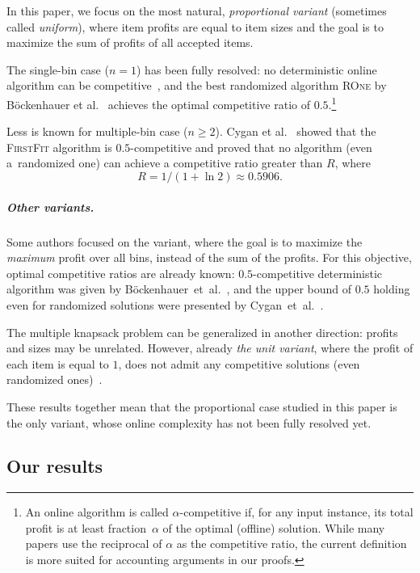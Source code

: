 \documentclass[a4paper,USenglish,cleveref]{lipics-v2019}
\newcommand{\R}{\ensuremath{R}}
\begin{document}
In this paper, we focus on the most natural, \emph{proportional variant}
(sometimes called \emph{uniform}), where item profits are equal to item sizes
and the goal is to maximize the sum of profits of all accepted items.

The single-bin case ($n = 1$) has been fully resolved: no deterministic online
algorithm can be competitive~\cite{MarVer95}, and the best randomized algorithm
\textsc{ROne} by Böckenhauer et al.~\cite{BKoKR14} achieves the optimal
competitive ratio of $0.5$.\footnote{An online algorithm is called
$\alpha$-competitive if, for any input instance, its total profit is at least
fraction~$\alpha$ of the optimal (offline) solution. While many papers use the
reciprocal of $\alpha$ as the competitive ratio, the current definition is more
suited for accounting arguments in our proofs.} 

Less is known for multiple-bin case ($n \geq 2$). Cygan et al.~\cite{CyJeSg16}
showed that the \textsc{FirstFit} algorithm is $0.5$-competitive and proved that
no algorithm (even a~randomized one) can achieve a competitive ratio greater than
$\R$, where 
\[
	\R = 1/(1+\ln 2) \approx 0.5906.
\]

\subparagraph{Other variants.}

Some authors focused on the variant, where the goal is to maximize the
\emph{maximum} profit over all bins, instead of the sum of the profits. For this
objective, optimal competitive ratios are already known: $0.5$-competitive
deterministic algorithm was given by Böckenhauer~et~al.~\cite{BKoKR14}, and the
upper bound of $0.5$ holding even for randomized solutions were presented by
Cygan~et~al.~\cite{CyJeSg16}.

The multiple knapsack problem can be generalized in another direction: profits
and sizes may be unrelated. However, already \emph{the unit variant}, where the
profit of each item is equal to $1$, does not admit any competitive solutions
(even randomized ones)~\cite{BoFaLN01}. 

These results together mean that the proportional case studied in this paper is
the only variant, whose online complexity has not been fully resolved yet.


\subsection{Our results}
\end{document}

